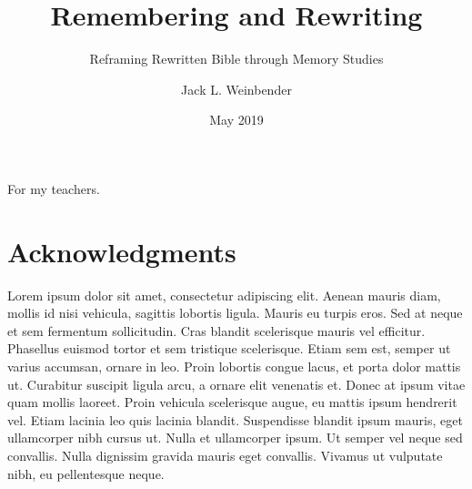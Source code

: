 

\author{Jack L. Weinbender}
\date{May 2019}
\title{Remembering and Rewriting}
\subtitle{Reframing Rewritten Bible through Memory Studies}


\makecopyright


\makesignatures

\maketitle

\clearpage
\vspace{3in}
{\Large For my teachers.}

\clearpage
\chapter*{Acknowledgments}
Lorem ipsum dolor sit amet, consectetur adipiscing elit. Aenean mauris diam, mollis id nisi vehicula, sagittis lobortis ligula. Mauris eu turpis eros. Sed at neque et sem fermentum sollicitudin. Cras blandit scelerisque mauris vel efficitur. Phasellus euismod tortor et sem tristique scelerisque. Etiam sem est, semper ut varius accumsan, ornare in leo. Proin lobortis congue lacus, et porta dolor mattis ut. Curabitur suscipit ligula arcu, a ornare elit venenatis et. Donec at ipsum vitae quam mollis laoreet. Proin vehicula scelerisque augue, eu mattis ipsum hendrerit vel. Etiam lacinia leo quis lacinia blandit. Suspendisse blandit ipsum mauris, eget ullamcorper nibh cursus ut. Nulla et ullamcorper ipsum. Ut semper vel neque sed convallis. Nulla dignissim gravida mauris eget convallis. Vivamus ut vulputate nibh, eu pellentesque neque. 

